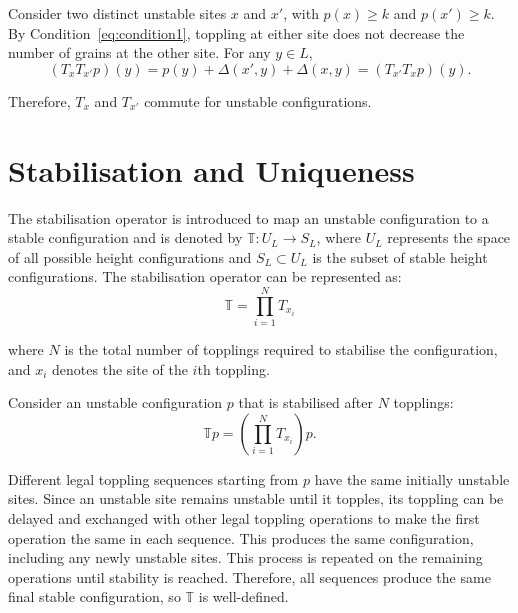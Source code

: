 Consider two distinct unstable sites $x$ and $x'$, with
$p(x)\geq k$ and $p(x')\geq k$.
By Condition~\eqref{eq:condition1}, toppling at either site
does not decrease the number of grains at the other site.
For any $y\in L$,
$$(T_xT_{x'}p)(y) =p(y)+\Delta(x',y)+\Delta(x,y) =(T_{x'}T_xp)(y). $$

Therefore, $T_x$ and $T_{x'}$ commute for unstable configurations.

\section{Stabilisation and Uniqueness}

The stabilisation operator is introduced to map an unstable configuration to a stable configuration and is denoted by $\mathbb{T}: U_L \rightarrow S_L$, where $U_L$ represents the space of all possible height configurations and $S_L \subset U_L$ is the subset of stable height configurations. The stabilisation operator can be represented as:
$$\mathbb{T} = \prod_{i= 1} ^N T_{x_i}$$

where $N$ is the total number of topplings required to stabilise the configuration, and $x_i$ denotes the site of the $i$th toppling.

Consider an unstable configuration $p$ that is stabilised after $N$ topplings:
$$\mathbb{T}p = \left(\prod_{i=1}^{N}T_{x_i}\right)p.$$

Different legal toppling sequences starting from $p$ have the same initially unstable sites. Since an unstable site remains unstable until it topples, its toppling can be delayed and exchanged with other legal toppling operations to make the first operation the same in each sequence. This produces the same configuration, including any newly unstable sites. This process is repeated on the remaining operations until stability is reached. Therefore, all sequences produce the same final stable configuration, so $\mathbb{T}$ is well-defined.
